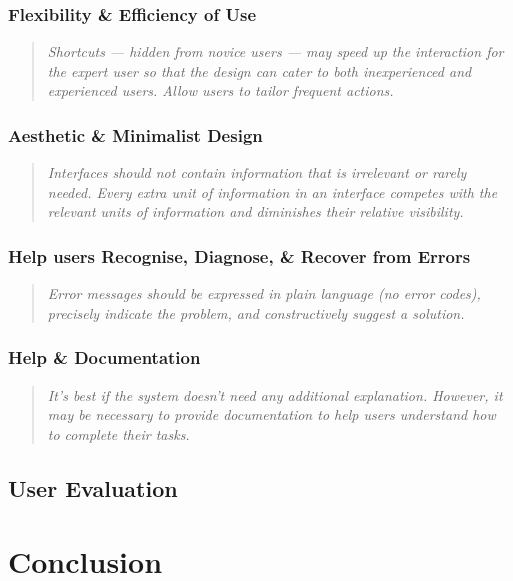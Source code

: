 \documentclass[a4paper,11pt]{report}
\begin{document}
\subsection{Flexibility \& Efficiency of Use}
\begin{quote}
    \textit{ Shortcuts — hidden from novice users — may speed up the interaction for the expert user so that the design can cater to both inexperienced and experienced users. Allow users to tailor frequent actions. }
\end{quote}

\subsection{Aesthetic \& Minimalist Design}
\begin{quote}
    \textit{ Interfaces should not contain information that is irrelevant or rarely needed. Every extra unit of information in an interface competes with the relevant units of information and diminishes their relative visibility. }
\end{quote}

\subsection{Help users Recognise, Diagnose, \& Recover from Errors}
\begin{quote}
    \textit{ Error messages should be expressed in plain language (no error codes), precisely indicate the problem, and constructively suggest a solution. }
\end{quote}

\subsection{Help \& Documentation}
\begin{quote}
    \textit{ It’s best if the system doesn’t need any additional explanation. However, it may be necessary to provide documentation to help users understand how to complete their tasks. }
\end{quote}

\section{User Evaluation}

\chapter{Conclusion}









\printbibliography
\end{document}
